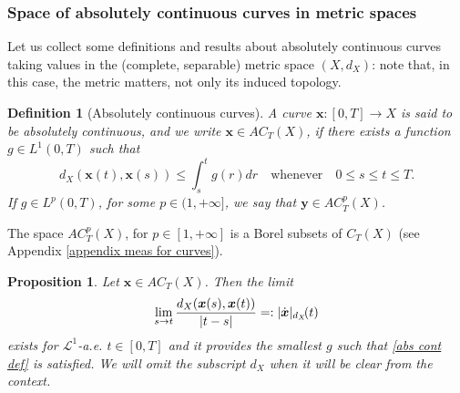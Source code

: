 \documentclass[10pt,leqno]{amsart}
\numberwithin{equation}{section}
\newtheorem{prop}[teorema]{Proposition}
\newtheorem{df}[teorema]{Definition}
\begin{document}




\subsubsection{Space of absolutely continuous curves in metric spaces}\label{subsub ac curve on metric spaces}
Let us collect some definitions and results about absolutely continuous curves taking values in 
the (complete, separable) metric space
$(X,d_X)$:
note that, in this case, the metric matters, not only its induced topology.

\begin{df}[Absolutely continuous curves]
   A curve $\boldsymbol{x}:[0,T] \to X$ is said to be absolutely continuous, and we write $\boldsymbol{x}\in 
   AC_T(X)$, if there exists a function $g\in L^1(0,T)$ such that 
   \begin{equation}\label{abs cont def}
        d_X(\boldsymbol{x}(t),\boldsymbol{x}(s)) \leq \int_s^t g(r) dr \quad \text{whenever}\quad 0\leq s \leq t \leq T.
   \end{equation}
   If $g\in L^p(0,T)$, for some $p\in (1,+\infty]$, we say that $\boldsymbol{y}\in 
   AC^p_T(X)$. 
\end{df}

\noindent The space $AC^p_T(X)$, for $p\in[1,+\infty]$ is a 
\nc 
Borel subsets of $C_T(X)$ (see Appendix \ref{appendix meas for curves}).

\begin{prop}
    Let $\boldsymbol{x} 
    \in AC_T(X)$. Then the limit 
    \begin{equation}
        \lim_{s\to t} \frac{d_X(
        \boldsymbol{x}(s),
        \boldsymbol{x}(t))}{|t-s|} =:|\dot{\boldsymbol{x}}|_{d_X}
        \kern-2pt(t)
    \end{equation}
    exists for $\mathcal{L}^1$-a.e. $t\in [0,T]$ 
    and it 
    provides the smallest $g$ such that \eqref{abs cont def} is satisfied.
    We will omit 
    the subscript $d_X$ 
    when it will be clear from the context.
\end{prop}
\end{document}
